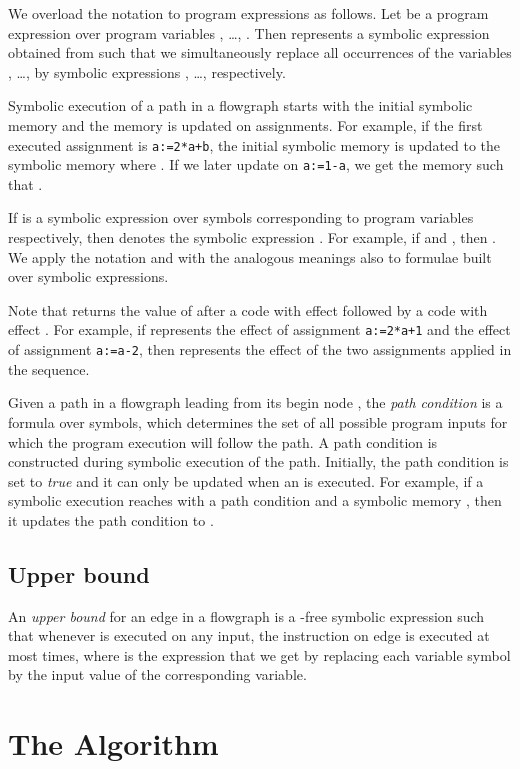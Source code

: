 \documentclass[10pt,a4paper]{article}
\begin{document}
We overload the notation  to program expressions as follows.
Let  be a program expression over program variables
, \ldots, . Then  represents
a symbolic expression obtained from  such that we
simultaneously replace all occurrences of the variables ,
\ldots,  by symbolic expressions , \ldots,
 respectively.

Symbolic execution of a path in a flowgraph starts with the initial symbolic
memory and the memory is updated on assignments. For example, if the first
executed assignment is \texttt{a:=2*a+b}, the initial symbolic memory
 is updated to the symbolic memory  where
. If we later
update  on \texttt{a:=1-a}, we get the memory  such that
.

If  is a symbolic expression over symbols  corresponding to program variables 
respectively, then  denotes the symbolic
expression . For example,
if  and , then
. We apply the notation
 and  with the analogous
meanings also to formulae  built over symbolic
expressions. 

Note that  returns the value of
 after a code with effect  followed by a code with effect
. For example, if  represents the
effect of assignment \texttt{a:=2*a+1} and  the
effect of assignment \texttt{a:=a-2}, then
 represents the effect of the two assignments applied in the
sequence.

Given a path in a flowgraph leading from its begin node ,
the \emph{path condition} is a formula over symbols, which determines the
set of all possible program inputs for which the program execution will
follow the path. A path condition is constructed during symbolic execution
of the path. Initially, the path condition is set to \textit{true} and it
can only be updated when an  is executed. For
example, if a symbolic execution reaches  with a
path condition  and a symbolic memory , then it updates the path condition to
.

\subsection{Upper bound}
\label{sec:upperbound}

An \emph{upper bound} for an edge  in a flowgraph  is a
-free symbolic expression  such that whenever  is executed on any input, the instruction on edge 
is executed at most  times, where  is the expression that we
get by replacing each variable symbol by the input value of the
corresponding variable.



\section{The Algorithm}\label{sec:alg}
\end{document}
